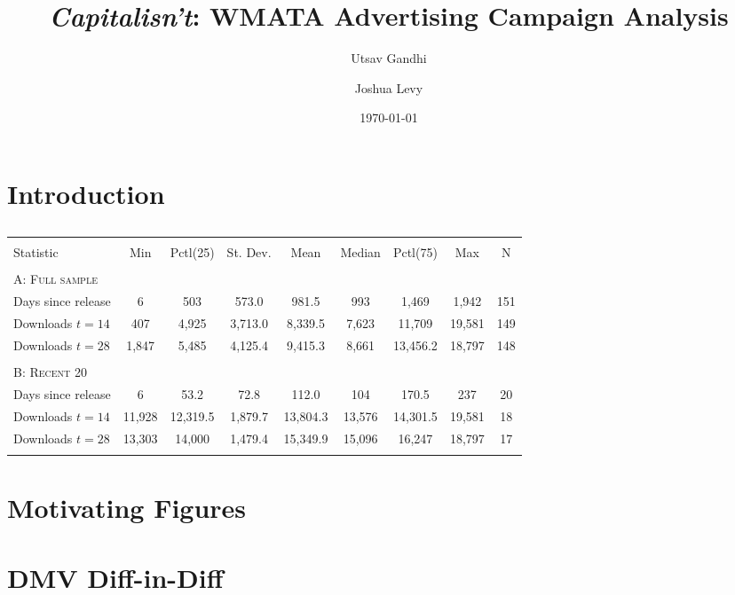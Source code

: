 \documentclass[11pt, letterpaper, twoside]{article}
\title{\singlespacing\textit{Capitalisn't}: WMATA Advertising Campaign Analysis}
\author{
   Utsav Gandhi
   \and
   Joshua Levy
}
\date{\today}
\begin{document}
\begin{titlepage}   
    \maketitle
    \thispagestyle{empty}
\end{titlepage}





\newpage
{}

\section{Introduction}

\begin{table}[!htbp] \centering 
    \caption{} 
    \label{} 
  \begin{tabular}{@{\extracolsep{5pt}}lcccccccc} 
  \\[-1.8ex]\hline \\[-1.8ex]
  Statistic & \multicolumn{1}{c}{Min} & \multicolumn{1}{c}{Pctl(25)} & \multicolumn{1}{c}{St. Dev.} & \multicolumn{1}{c}{Mean} & \multicolumn{1}{c}{Median} & \multicolumn{1}{c}{Pctl(75)} & \multicolumn{1}{c}{Max} & \multicolumn{1}{c}{N} \\
  \hline 
  \hline \\[-1.8ex]
  \textsc{A: Full sample} & & & & & & & & \\
  Days since release & 6 & 503 & 573.0 & 981.5 & 993 & 1,469 & 1,942 & 151 \\
  Downloads $t=14$ & 407 & 4,925 & 3,713.0 & 8,339.5 & 7,623 & 11,709 & 19,581 & 149 \\ 
  Downloads $t=28$ & 1,847 & 5,485 & 4,125.4 & 9,415.3 & 8,661 & 13,456.2 & 18,797 & 148 \\
  \hline \\[-1.8ex]
  \textsc{B: Recent 20} & & & & & & & & \\
  Days since release & 6 & 53.2 & 72.8 & 112.0 & 104 & 170.5 & 237 & 20 \\
  Downloads $t=14$ & 11,928 & 12,319.5 & 1,879.7 & 13,804.3 & 13,576 & 14,301.5 & 19,581 & 18 \\ 
  Downloads $t=28$ & 13,303 & 14,000 & 1,479.4 & 15,349.9 & 15,096 & 16,247 & 18,797 & 17 \\
  \hline
  \hline \\[-1.8ex] 
  \end{tabular}
\end{table}


\section{Motivating Figures}

\section{DMV Diff-in-Diff}
\end{document}

